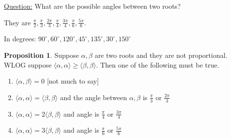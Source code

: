 \documentclass{article}
\theoremstyle{definition}
\newtheorem{proposition}{Proposition}
\begin{document}
\underline{Question:} What are the possible angles between two roots?

They are \(\frac{\pi}{2},\frac{\pi}{3},\frac{2\pi}{3},\frac{\pi}{4},\frac{3\pi}{4},\frac{\pi}{6},\frac{5\pi}{6}\).

In degrees: \(90^\circ, 60^\circ,120^\circ, 45^\circ, 135^\circ, 30^\circ,150^\circ\) 

\begin{proposition}
    Suppose \(\alpha ,\beta \) are two roots and they are not proportional. WLOG suppose \(\langle \alpha ,\alpha  \rangle \geq \langle \beta ,\beta  \rangle \). Then one of the following must be true.

    \begin{enumerate}
        \item \(\langle \alpha ,\beta  \rangle = 0\) [not much to say]
        \item \(\langle \alpha,\alpha  \rangle = \langle \beta ,\beta  \rangle \) and the angle between \(\alpha ,\beta \) is \(\frac{\pi}{3}\) or \(\frac{2\pi }{3}\) 
        \item \(\langle \alpha ,\alpha  \rangle = 2 \langle \beta ,\beta  \rangle \) and angle is \(\frac{\pi}{4}\) or \(\frac{3\pi }{4}\) 
        \item \(\langle \alpha ,\alpha  \rangle = 3 \langle \beta ,\beta  \rangle \) and angle is \(\frac{\pi}{6}\) or \(\frac{5\pi}{6}\) 
    \end{enumerate}

\end{proposition}
\end{document}
